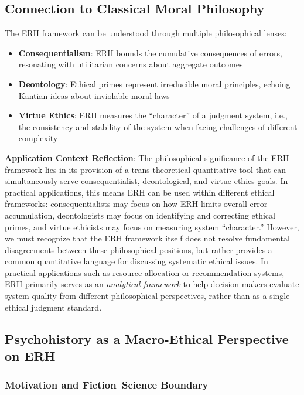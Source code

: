 \documentclass[12pt,a4paper]{article}
\theoremstyle{definition}
\theoremstyle{remark}
\begin{document}
\subsection{Connection to Classical Moral Philosophy}

The ERH framework can be understood through multiple philosophical lenses:
\begin{itemize}
    \item \textbf{Consequentialism}: ERH bounds the cumulative consequences of errors, resonating with utilitarian concerns about aggregate outcomes \citep{mill1863}
    \item \textbf{Deontology}: Ethical primes represent irreducible moral principles, echoing Kantian ideas about inviolable moral laws \citep{kant1785}
    \item \textbf{Virtue Ethics}: ERH measures the ``character'' of a judgment system, i.e., the consistency and stability of the system when facing challenges of different complexity
\end{itemize}

\textbf{Application Context Reflection}: The philosophical significance of the ERH framework lies in its provision of a trans-theoretical quantitative tool that can simultaneously serve consequentialist, deontological, and virtue ethics goals. In practical applications, this means ERH can be used within different ethical frameworks: consequentialists may focus on how ERH limits overall error accumulation, deontologists may focus on identifying and correcting ethical primes, and virtue ethicists may focus on measuring system ``character.'' However, we must recognize that the ERH framework itself does not resolve fundamental disagreements between these philosophical positions, but rather provides a common quantitative language for discussing systematic ethical issues. In practical applications such as resource allocation or recommendation systems, ERH primarily serves as an \emph{analytical framework} to help decision-makers evaluate system quality from different philosophical perspectives, rather than as a single ethical judgment standard.

\subsection{Psychohistory as a Macro-Ethical Perspective on ERH}
\label{subsec:psychohistory}

\subsubsection{Motivation and Fiction--Science Boundary}
\end{document}
